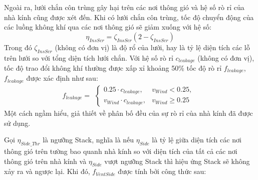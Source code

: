 \documentclass[a4paper]{article}
\begin{document}
\par
Ngoài ra, lưới chắn côn trùng gây hại trên các nơi thông gió và hệ số rò rỉ của nhà kính cũng được xét đến. Khi có lưới chắn côn trùng, tốc độ chuyển động của các luồng không khí qua các nơi thông gió sẽ giảm xuống với hệ số:
\begin{equation}\label{eq:11}
    \eta_{InsScr} = \zeta_{InsScr}(2 - \zeta_{InsScr})
\end{equation}
Trong đó $\zeta_{InsScr}$ (không có đơn vị) là độ rổ của lưới, hay là tỷ lệ diện tích các lỗ trên lưới so với tổng diện tích lưới chắn. Với hệ số rò rỉ $c_{leakage}$ (không có đơn vị), tốc độ trao đổi không khí thường được xấp xỉ khoảng 50\% tốc độ rò rỉ $f_{leakage}$, $f_{leakage}$ được xác định như sau:
\begin{equation}\label{eq:12}
    f_{leakage} =
    \begin{aligned}
        \begin{cases}
            0.25 \cdot c_{leakage},      &v_{Wind} < 0.25, \\
            v_{Wind} \cdot c_{leakage},  &v_{Wind} \geq 0.25
        \end{cases}
    \end{aligned}
\end{equation}
Một cách ngầm hiểu, giả thiết về phân bố đều của sự rò rỉ của nhà kính đã được sử dụng.
\par

\iffalse
Gọi $\eta_{Side\_Thr}$ là ngưỡng Stack, nghĩa là nếu $\eta_{Side}$ là tỷ lệ giữa diện tích các nơi thông gió trên tường bao quanh nhà kính so với diện tích của tất cả các nơi thông gió trên nhà kính và $\eta_{Side}$ vượt ngưỡng Stack thì hiệu ứng Stack sẽ không xảy ra và ngược lại. Khi đó, $f_{VentSide}$ được tính bởi công thức sau:
\end{document}
